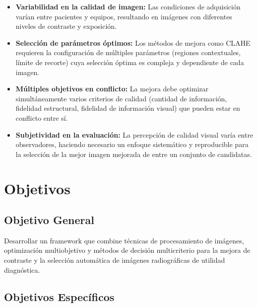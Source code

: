 \begin{itemize}
    \item \textbf{Variabilidad en la calidad de imagen:} Las condiciones de adquisición varían entre pacientes y equipos, resultando en imágenes con diferentes niveles de contraste y exposición.

    \item \textbf{Selección de parámetros óptimos:} Los métodos de mejora como CLAHE requieren la configuración de múltiples parámetros (regiones contextuales, límite de recorte) cuya selección óptima es compleja y dependiente de cada imagen.

    \item \textbf{Múltiples objetivos en conflicto:} La mejora debe optimizar simultáneamente varios criterios de calidad (cantidad de información, fidelidad estructural, fidelidad de información visual) que pueden estar en conflicto entre sí.

    \item \textbf{Subjetividad en la evaluación:} La percepción de calidad visual varía entre observadores, haciendo necesario un enfoque sistemático y reproducible para la selección de la mejor imagen mejorada de entre un conjunto de candidatas.
\end{itemize}

\section{Objetivos}

\subsection{Objetivo General}

Desarrollar un framework que combine técnicas de procesamiento de imágenes, optimización multiobjetivo y métodos de decisión multicriterio para la mejora de contraste y la selección automática de imágenes radiográficas de utilidad diagnóstica.

\subsection{Objetivos Específicos}

